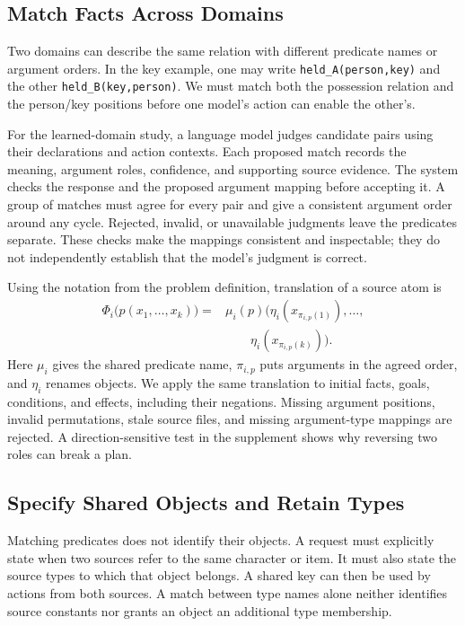 \documentclass[letterpaper]{article}
\newcommand{\enc}{\Phi}
\begin{document}
\subsection{Match Facts Across Domains}
Two domains can describe the same relation with different predicate names or argument orders. In the key example, one may write \texttt{held\_A(person,key)} and the other \texttt{held\_B(key,person)}. We must match both the possession relation and the person/key positions before one model's action can enable the other's.

For the learned-domain study, a language model judges candidate pairs using their declarations and action contexts. Each proposed match records the meaning, argument roles, confidence, and supporting source evidence. The system checks the response and the proposed argument mapping before accepting it. A group of matches must agree for every pair and give a consistent argument order around any cycle. Rejected, invalid, or unavailable judgments leave the predicates separate. These checks make the mappings consistent and inspectable; they do not independently establish that the model's judgment is correct.

Using the notation from the problem definition, translation of a source atom is
\begin{equation}
\begin{split}
\enc_i\bigl(p(x_1,\ldots,x_k)\bigr)
={}&\mu_i(p)\bigl(\eta_i(x_{\pi_{i,p}(1)}),\ldots,\\
&\hspace{2em}\eta_i(x_{\pi_{i,p}(k)})\bigr).
\end{split}
\end{equation}
Here $\mu_i$ gives the shared predicate name, $\pi_{i,p}$ puts arguments in the agreed order, and $\eta_i$ renames objects. We apply the same translation to initial facts, goals, conditions, and effects, including their negations. Missing argument positions, invalid permutations, stale source files, and missing argument-type mappings are rejected. A direction-sensitive test in the supplement shows why reversing two roles can break a plan.

\subsection{Specify Shared Objects and Retain Types}
Matching predicates does not identify their objects. A request must explicitly state when two sources refer to the same character or item. It must also state the source types to which that object belongs. A shared key can then be used by actions from both sources. A match between type names alone neither identifies source constants nor grants an object an additional type membership.
\end{document}
